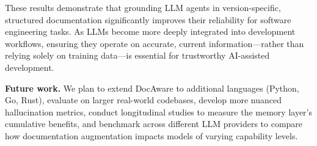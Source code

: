 \documentclass[sigconf,nonacm]{acmart}
\begin{document}
These results demonstrate that grounding LLM agents in version-specific, structured documentation significantly improves their reliability for software engineering tasks. As LLMs become more deeply integrated into development workflows, ensuring they operate on accurate, current information---rather than relying solely on training data---is essential for trustworthy AI-assisted development.

\textbf{Future work.} We plan to extend DocAware to additional languages (Python, Go, Rust), evaluate on larger real-world codebases, develop more nuanced hallucination metrics, conduct longitudinal studies to measure the memory layer's cumulative benefits, and benchmark across different LLM providers to compare how documentation augmentation impacts models of varying capability levels.




\end{document}
